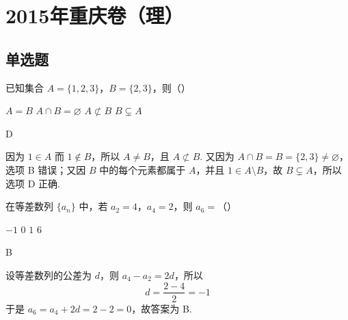 \chapter{2015年重庆卷（理）}

\section{单选题}

\begin{problem}
已知集合 \(A = \{1, 2, 3\}\)，\(B = \{2, 3\}\)，则（\quad）

\choices
    {\(A = B\)}
    {\(A \cap B = \varnothing\)}
    {\(A \not\subset B\)}
    {\(B \subsetneq A\)}

\begin{answer}
D
\end{answer}

\begin{solution}
因为 \(1\in A\) 而 \(1\notin B\)，所以 \(A\ne B\)，且 \(A\not\subset B\). 又因为 \(A\cap B=B=\{2,3\}\ne\varnothing\)，选项 B 错误；又因 \(B\) 中的每个元素都属于 \(A\)，并且 \(1\in A\setminus B\)，故 \(B\subsetneq A\)，所以选项 D 正确.
\end{solution}
\end{problem}

\begin{problem}
在等差数列 \(\{a_{n}\}\) 中，若 \(a_{2} = 4\)，\(a_{4} = 2\)，则 \(a_{6} =\)（\quad）

\choices
    {\(-1\)}
    {\(0\)}
    {\(1\)}
    {\(6\)}

\begin{answer}
B
\end{answer}

\begin{solution}
设等差数列的公差为 \(d\)，则 \(a_{4}-a_{2}=2d\)，所以
\[
d=\frac{2-4}{2}=-1
\]
于是 \(a_{6}=a_{4}+2d=2-2=0\)，故答案为 B.
\end{solution}
\end{problem}

